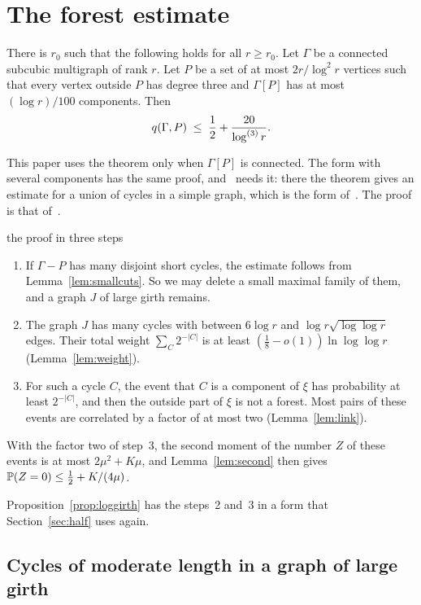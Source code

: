 \section{The forest estimate}\label{sec:forest}

\begin{theorem}\label{thm:forest}
There is $r_0$ such that the following holds for all $r\ge r_0$. Let $\Gamma$ be a connected
subcubic multigraph of rank $r$. Let $P$ be a set of at most $2r/\log^{2}r$ vertices such that
every vertex outside $P$ has degree three and $\Gamma[P]$ has at most $(\log r)/100$ components.
Then
\[
  q(\Gamma,P)\;\le\;\frac12+\frac{20}{\log^{(3)}r}.
\]
\end{theorem}

This paper uses the theorem only when $\Gamma[P]$ is connected. The form with several components
has the same proof, and~\cite{Pan} needs it: there the theorem gives an estimate for a union of
cycles in a simple graph, which is the form of~\cite{KNT}. The proof is that of~\cite{KNT}.

\begin{idea}{the proof in three steps}
\begin{enumerate}[leftmargin=1.5em]
\item If $\Gamma-P$ has many disjoint short cycles, the estimate follows from
Lemma~\ref{lem:smallcuts}. So we may delete a small maximal family of them, and a graph $J$ of
large girth remains.
\item The graph $J$ has many cycles with between $6\log r$ and $\log r\sqrt{\log\log r}$ edges.
Their total weight $\sum_C2^{-|C|}$ is at least $(\frac18-o(1))\ln\log\log r$
(Lemma~\ref{lem:weight}).
\item For such a cycle $C$, the event that $C$ is a component of $\xi$ has probability at least
$2^{-|C|}$, and then the outside part of $\xi$ is not a forest. Most pairs of these events are
correlated by a factor of at most two (Lemma~\ref{lem:link}).
\end{enumerate}
With the factor two of step~3, the second moment of the number $Z$ of these events is at most
$2\mu^{2}+K\mu$, and Lemma~\ref{lem:second} then gives $\mathbb{P}(Z=0)\le\tfrac12+K/(4\mu)$.
\end{idea}

Proposition~\ref{prop:loggirth} has the steps~2 and~3 in a form that Section~\ref{sec:half} uses
again.

\subsection{Cycles of moderate length in a graph of large girth}\label{sec:moderate}

